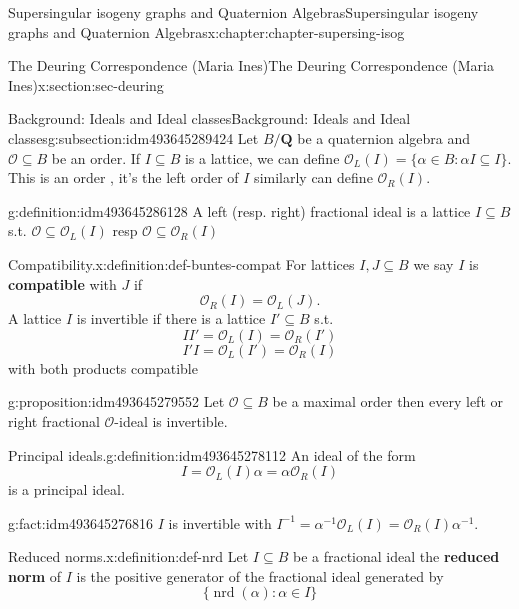 \documentclass[oneside,10pt,]{book}
\newcommand{\terminology}[1]{\textbf{#1}}
\numberwithin{equation}{section}
\newcommand{\inv}{^{-1}}
\newcommand{\QQ}{\mathbf{Q}}
\newcommand{\ints}{\mathcal{O}}
\begin{document}
\begin{chapterptx}{Supersingular isogeny graphs and Quaternion Algebras}{}{Supersingular isogeny graphs and Quaternion Algebras}{}{}{x:chapter:chapter-supersing-isog}
\begin{sectionptx}{The Deuring Correspondence (Maria Ines)}{}{The Deuring Correspondence (Maria Ines)}{}{}{x:section:sec-deuring}
\begin{subsectionptx}{Background: Ideals and Ideal classes}{}{Background: Ideals and Ideal classes}{}{}{g:subsection:idm493645289424}
Let \(B/\QQ\) be a quaternion algebra and  \(\ints \subseteq B\) be an order. If \(I \subseteq B \) is a  lattice, we can define \(\ints_L (I) = \{ \alpha\in  B :  \alpha I  \subseteq I \}\). This is an order , it's the left order of  \(I\) similarly can define \(\ints_R (I) \).%
\begin{definition}{}{g:definition:idm493645286128}%
A left (resp. right) fractional ideal is a lattice \(I \subseteq B\) s.t. \(\ints \subseteq       \ints_L (I) \) resp \(\ints \subseteq \ints_R (I) \)%
\end{definition}
\begin{definition}{Compatibility.}{x:definition:def-buntes-compat}%
For lattices \(I,J \subseteq B\) we say \(I\) is \terminology{compatible} with \(J\) if%
\begin{equation*}
\ints_R(I)= \ints_L(J)\text{.}
\end{equation*}
A lattice \(I \) is invertible if there is a lattice \(I' \subseteq B\) s.t.%
\begin{equation*}
II' = \ints_L(I) =  \ints_R(I')
\end{equation*}
%
\begin{equation*}
I'I = \ints_L(I') =  \ints_R(I)
\end{equation*}
with both products compatible%
\end{definition}
\begin{proposition}{}{}{g:proposition:idm493645279552}%
Let \(\ints \subseteq B\) be a maximal order then every left or right fractional \(\ints\)-ideal is invertible.%
\end{proposition}
\begin{definition}{Principal ideals.}{g:definition:idm493645278112}%
An ideal of the form%
\begin{equation*}
I =  \ints_L(I) \alpha =  \alpha\ints_R(I)
\end{equation*}
is a principal ideal.%
\end{definition}
\begin{fact}{}{}{g:fact:idm493645276816}%
\(I \) is invertible with \(I\inv = \alpha \inv \ints_L(I) =  \ints_R(I) \alpha \inv\).%
\end{fact}
\begin{definition}{Reduced norms.}{x:definition:def-nrd}%
Let \(I \subseteq B\) be a fractional ideal the \terminology{reduced norm} of \(I \) is the positive generator of the fractional ideal generated by%
\begin{equation*}
\{ \operatorname{nrd} (\alpha) :  \alpha \in I \}
\end{equation*}

\end{definition}
\end{subsectionptx}
\end{sectionptx}
\end{chapterptx}
\end{document}
